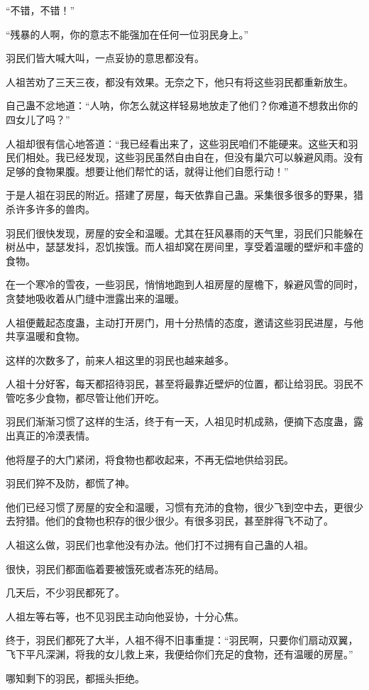 \begin{this_body}
“不错，不错！”

“残暴的人啊，你的意志不能强加在任何一位羽民身上。”

羽民们皆大喊大叫，一点妥协的意思都没有。

人祖苦劝了三天三夜，都没有效果。无奈之下，他只有将这些羽民都重新放生。

自己蛊不忿地道：“人呐，你怎么就这样轻易地放走了他们？你难道不想救出你的四女儿了吗？”

人祖却很有信心地答道：“我已经看出来了，这些羽民咱们不能硬来。这些天和羽民们相处。我已经发现，这些羽民虽然自由自在，但没有巢穴可以躲避风雨。没有足够的食物果腹。想要让他们帮忙的话，就得让他们自愿行动！”

于是人祖在羽民的附近。搭建了房屋，每天依靠自己蛊。采集很多很多的野果，猎杀许多许多的兽肉。

羽民们很快发现，房屋的安全和温暖。尤其在狂风暴雨的天气里，羽民们只能躲在树丛中，瑟瑟发抖，忍饥挨饿。而人祖却窝在房间里，享受着温暖的壁炉和丰盛的食物。

在一个寒冷的雪夜，一些羽民，悄悄地跑到人祖房屋的屋檐下，躲避风雪的同时，贪婪地吸收着从门缝中泄露出来的温暖。

人祖便戴起态度蛊，主动打开房门，用十分热情的态度，邀请这些羽民进屋，与他共享温暖和食物。

这样的次数多了，前来人祖这里的羽民也越来越多。

人祖十分好客，每天都招待羽民，甚至将最靠近壁炉的位置，都让给羽民。羽民不管吃多少食物，都尽管让他们开吃。

羽民们渐渐习惯了这样的生活，终于有一天，人祖见时机成熟，便摘下态度蛊，露出真正的冷漠表情。

他将屋子的大门紧闭，将食物也都收起来，不再无偿地供给羽民。

羽民们猝不及防，都慌了神。

他们已经习惯了房屋的安全和温暖，习惯有充沛的食物，很少飞到空中去，更很少去狩猎。他们的食物也积存的很少很少。有很多羽民，甚至胖得飞不动了。

人祖这么做，羽民们也拿他没有办法。他们打不过拥有自己蛊的人祖。

很快，羽民们都面临着要被饿死或者冻死的结局。

几天后，不少羽民都死了。

人祖左等右等，也不见羽民主动向他妥协，十分心焦。

终于，羽民们都死了大半，人祖不得不旧事重提：“羽民啊，只要你们扇动双翼，飞下平凡深渊，将我的女儿救上来，我便给你们充足的食物，还有温暖的房屋。”

哪知剩下的羽民，都摇头拒绝。


\end{this_body}
